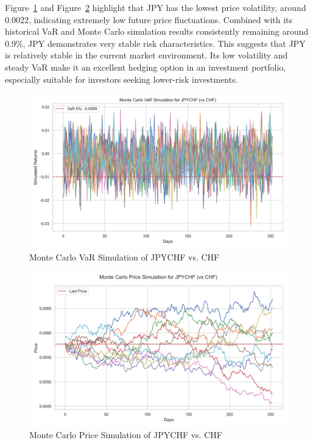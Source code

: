 \documentclass{article}
\begin{document}
Figure~\ref{fig:monte_carlo_var_simulation_JPYCHF_vs_CHF} and Figure~\ref{fig:monte_carlo_price_simulation_JPYCHF_vs_CHF} highlight that JPY has the lowest price volatility, around 0.0022, indicating extremely low future price fluctuations. Combined with its historical VaR and Monte Carlo simulation results consistently remaining around 0.9\%, JPY demonstrates very stable risk characteristics. This suggests that JPY is relatively stable in the current market environment. Its low volatility and steady VaR make it an excellent hedging option in an investment portfolio, especially suitable for investors seeking lower-risk investments.

\begin{figure}[h]
    \centering
    \includegraphics[width=0.75\linewidth]{reports/figures/monte_carlo_var_simulation_JPYCHF_vs_CHF.png}
    \caption{Monte Carlo VaR Simulation of JPYCHF vs. CHF}   \label{fig:monte_carlo_var_simulation_JPYCHF_vs_CHF}
\end{figure}

\begin{figure}[h]
    \centering
    \includegraphics[width=0.75\linewidth]{reports/figures/monte_carlo_price_simulation_JPYCHF_vs_CHF.png}
    \caption{Monte Carlo Price Simulation of JPYCHF vs. CHF}  \label{fig:monte_carlo_price_simulation_JPYCHF_vs_CHF}
\end{figure}
\end{document}
